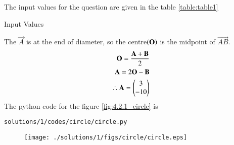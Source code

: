  
 The input values for the question are given in the table \eqref{table:table1}
\begin{table}[ht!]
\centering

\caption{Input Values}
\label{table:table1}	
\end{table}
The $\vec{A}$ is at the end of diameter, so the centre$\left(\mathbf{O}\right)$ is the midpoint of $\vec{AB}$.
\begin{align}
\mathbf{O}=\frac{\mathbf{A}+\mathbf{B}}{2}
\\
\mathbf{A}=2\mathbf{O}-\mathbf{B}
\\
\therefore \mathbf{A}=\begin{pmatrix}3\\-10\end{pmatrix}
\end{align}
The python code for the figure \eqref{fig:4.2.1_circle} is\begin{lstlisting}
solutions/1/codes/circle/circle.py
\end{lstlisting}
\begin{figure}[!ht]
\centering
\texttt{[image: ./solutions/1/figs/circle/circle.eps]}
\caption{}
\label{fig:4.2.1_circle}
\end{figure}

